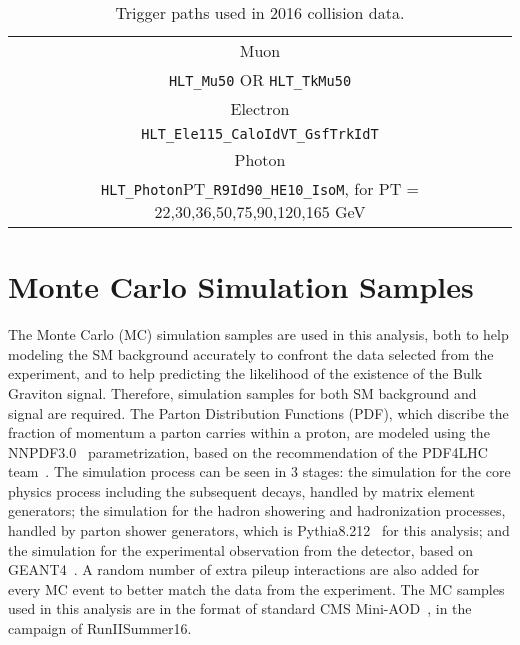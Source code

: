 \begin{table}[htbp!]
\begin{small}
   \caption{Trigger paths used in 2016 collision data.
   \label{tab:triggerPaths}}
   \centering
   \begin{tabular}{ c }
\hline\hline
Muon  \\ \texttt{HLT\_Mu50} OR \texttt{HLT\_TkMu50}  \\ \hline
Electron \\ \texttt{HLT\_Ele115\_CaloIdVT\_GsfTrkIdT} \\ \hline
Photon \\ \texttt{HLT\_Photon}PT\texttt{\_R9Id90\_HE10\_IsoM},  for PT = 22,30,36,50,75,90,120,165 GeV \\  
\hline
\hline
    \end{tabular}
\end{small}
\end{table}


\section{Monte Carlo Simulation Samples}
The Monte Carlo (MC) simulation samples are used in this analysis, both to help modeling the SM background accurately to confront the data selected from the experiment, and to help predicting the likelihood of the existence of the Bulk Graviton signal. Therefore, simulation samples for both SM background and signal are required. The Parton Distribution Functions (PDF), which discribe the fraction of momentum a parton carries within a proton, are modeled using the NNPDF3.0~\cite{sample_nnpdf30} parametrization, based on the recommendation of the PDF4LHC team~\cite{sample_pdf4lhc}. The simulation process can be seen in 3 stages: the simulation for the core physics process including the subsequent decays, handled by matrix element generators; the simulation for the hadron showering and hadronization processes, handled by parton shower generators, which is Pythia8.212~\cite{sample_pythia} for this analysis; and the simulation for the experimental observation from the detector, based on GEANT4~\cite{sample_geant4}. A random number of extra pileup interactions are also added for every MC event to better match the data from the experiment. The MC samples used in this analysis are in the format of standard CMS Mini-AOD~\cite{sample_miniaod}, in the campaign of RunIISummer16.


